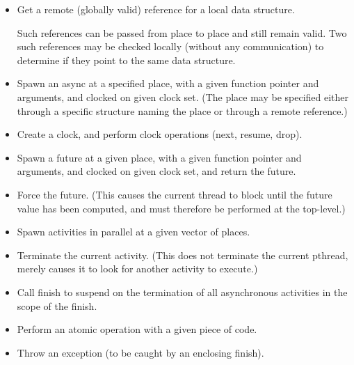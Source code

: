 \begin{itemize}
\item Get a remote (globally valid) reference for a local data structure.

  Such references can be passed from place to place and still remain
  valid. Two such references may be checked locally (without any
  communication) to determine if they point to the same data
  structure.

\item Spawn an async at a specified place, with a given function pointer
  and arguments, and clocked on given clock set. (The place may be
  specified either through a specific structure naming the place or
  through a remote reference.)


\item Create a clock, and perform clock operations (next, resume, drop).

\item Spawn a future at a given place, with a given function
  pointer and arguments, and clocked on given clock set, and return
  the future.

\item Force the future. (This causes the current thread to block until the
  future value has been computed, and must therefore be performed at
  the top-level.)

\item Spawn activities in parallel at a given vector of places.

\item Terminate the current activity. (This does not terminate the current
  pthread, merely causes it to look for another activity to execute.)

\item Call finish to suspend on the termination of all asynchronous
  activities in the scope of the finish.

\item Perform an atomic operation with a given piece of code.
\item Throw an exception (to be caught by an enclosing finish).


\end{itemize}
